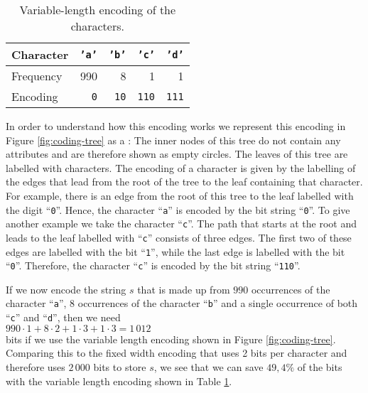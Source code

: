 \begin{table}[htbp]
  \centering
\begin{tabular}[t]{|l|r|r|r|r|}
\hline
Character  & \texttt{'a'} & \texttt{'b'}  & \texttt{'c'}   & \texttt{'d'}   \\
\hline
\hline
Frequency &     990    &         8   &           1  &         1    \\
\hline
Encoding  & \texttt{0} & \texttt{10} & \texttt{110} & \texttt{111} \\
\hline
\end{tabular}
  \caption{Variable-length encoding of the characters.}
  \label{tab:coding}
\end{table}
In order to understand how this encoding works we represent this encoding in Figure
 \ref{fig:coding-tree} as a  :  The inner nodes of this tree do not contain any attributes
 and are therefore shown as empty circles.  The leaves of this tree are labelled with characters.
The encoding of a character is given by the labelling of the edges that lead from the root of the tree to the
leaf containing that character.  For example, there is an edge from the root of this tree to the leaf labelled
with the digit ``\texttt{0}''.  Hence, the character ``\texttt{a}'' is encoded by the bit string ``\texttt{0}''.
To give another example we take the character ``\texttt{c}''.   The path that starts at the root and leads to
the leaf labelled with ``\texttt{c}'' consists of three edges.  The first two of these edges are labelled with
the bit ``\texttt{1}'', while the last edge is labelled with the bit ``\texttt{0}''.  Therefore, the character
 ``\texttt{c}'' is encoded by the bit string ``\texttt{110}''.

If we now encode the string $s$ that is made up from  $990$ occurrences of the character
``\texttt{a}'', $8$ occurrences of the character ``\texttt{b}'' and a single occurrence of both ``\texttt{c}''
and ``\texttt{d}'', then we need
\\[0.2cm]
\hspace*{1.3cm}
$990 \cdot 1 + 8 \cdot 2 + 1 \cdot 3 + 1 \cdot 3 = 1\,012$
\\[0.2cm]
bits if we use the variable length encoding shown in Figure \ref{fig:coding-tree}.  Comparing this to the fixed
width encoding that uses 2 bits per character and therefore uses $2\,000$ bits to store $s$, we see that we can
save $49,4\%$ of the bits with the variable length encoding shown in Table \ref{tab:coding}.


